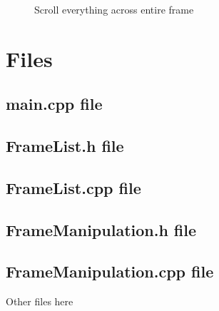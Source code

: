 \documentclass[11pt]{article} %
\begin{document}
\begin{figure}[H]
	\centering
	\caption{Scroll everything across entire frame}
	\label{fig:UC14}
\end{figure}

  
\newpage
\section{Files}
\subsection{main.cpp file}


\newpage
\subsection{FrameList.h file}

\newpage
\subsection{FrameList.cpp file}


\newpage
\subsection{FrameManipulation.h file}

\newpage
\subsection{FrameManipulation.cpp file}


\newpage
 Other files here
\end{document}
